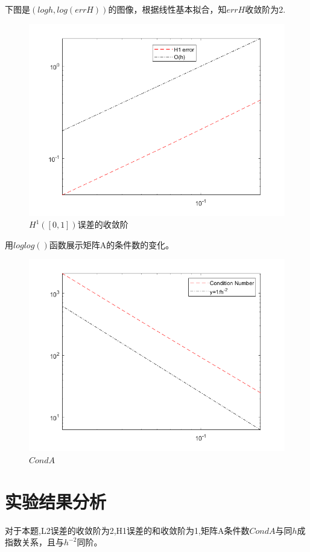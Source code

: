 \documentclass{article}
\begin{document}
\newpage
下图是$(logh,log(errH))$的图像，根据线性基本拟合，知$errH$收敛阶为2.
\begin{figure}[H]
\centering
\includegraphics[scale=0.5]{errH1.png}
\caption{\label{H1_err}$H^{1}([0,1])$误差的收敛阶}
\end{figure}



用$loglog()$函数展示矩阵A的条件数的变化。
\begin{figure}[H]
\centering
\includegraphics[scale=0.5]{CondA.png}
\caption{\label{CondA}$CondA$}
\end{figure}


\section{实验结果分析}
对于本题,L2误差的收敛阶为2,H1误差的和收敛阶为1,矩阵A条件数$CondA$与同$h$成指数关系，且与$h^{-2}$同阶。
\end{document}
